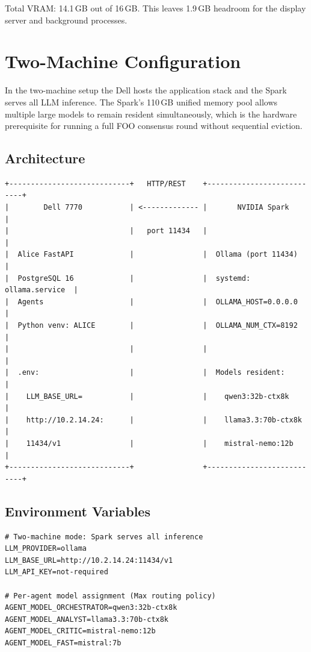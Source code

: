 Total VRAM: 14.1\,GB out of 16\,GB. This leaves 1.9\,GB headroom for
the display server and background processes.

\section{Two-Machine Configuration}
\label{sec:two-machine}

In the two-machine setup the Dell hosts the application stack and the
Spark serves all LLM inference. The Spark's 110\,GB unified memory pool
allows multiple large models to remain resident simultaneously, which is
the hardware prerequisite for running a full FOO consensus round without
sequential eviction.

\subsection{Architecture}

\begin{verbatim}
+----------------------------+   HTTP/REST    +---------------------------+
|        Dell 7770           | <------------- |       NVIDIA Spark        |
|                            |   port 11434   |                           |
|  Alice FastAPI             |                |  Ollama (port 11434)      |
|  PostgreSQL 16             |                |  systemd: ollama.service  |
|  Agents                    |                |  OLLAMA_HOST=0.0.0.0      |
|  Python venv: ALICE        |                |  OLLAMA_NUM_CTX=8192      |
|                            |                |                           |
|  .env:                     |                |  Models resident:         |
|    LLM_BASE_URL=           |                |    qwen3:32b-ctx8k        |
|    http://10.2.14.24:      |                |    llama3.3:70b-ctx8k     |
|    11434/v1                |                |    mistral-nemo:12b       |
+----------------------------+                +---------------------------+
\end{verbatim}

\subsection{Environment Variables}

\begin{lstlisting}[style=bashstyle, caption={.env for two-machine mode (Dell application host)}]
# Two-machine mode: Spark serves all inference
LLM_PROVIDER=ollama
LLM_BASE_URL=http://10.2.14.24:11434/v1
LLM_API_KEY=not-required

# Per-agent model assignment (Max routing policy)
AGENT_MODEL_ORCHESTRATOR=qwen3:32b-ctx8k
AGENT_MODEL_ANALYST=llama3.3:70b-ctx8k
AGENT_MODEL_CRITIC=mistral-nemo:12b
AGENT_MODEL_FAST=mistral:7b
\end{lstlisting}

